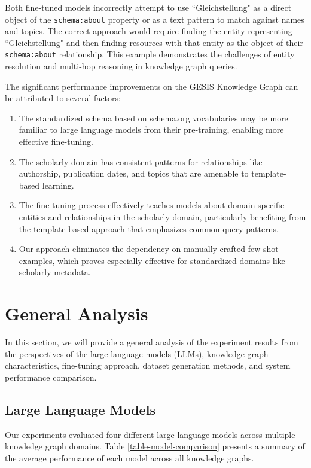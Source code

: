 Both fine-tuned models incorrectly attempt to use ``Gleichstellung" as a direct object of the \texttt{schema:about} property or as a text pattern to match against names and topics. The correct approach would require finding the entity representing ``Gleichstellung" and then finding resources with that entity as the object of their \texttt{schema:about} relationship. This example demonstrates the challenges of entity resolution and multi-hop reasoning in knowledge graph queries.

The significant performance improvements on the GESIS Knowledge Graph can be attributed to several factors:

\begin{enumerate}
    \item The standardized schema based on schema.org vocabularies may be more familiar to large language models from their pre-training, enabling more effective fine-tuning.
    \item The scholarly domain has consistent patterns for relationships like authorship, publication dates, and topics that are amenable to template-based learning.
    \item The fine-tuning process effectively teaches models about domain-specific entities and relationships in the scholarly domain, particularly benefiting from the template-based approach that emphasizes common query patterns.
    \item Our approach eliminates the dependency on manually crafted few-shot examples, which proves especially effective for standardized domains like scholarly metadata.
\end{enumerate}

\section{General Analysis}
In this section, we will provide a general analysis of the experiment results from the perspectives of the large language models (LLMs), knowledge graph characteristics, fine-tuning approach, dataset generation methods, and system performance comparison.

\subsection{Large Language Models}
\label{ga-llm}

Our experiments evaluated four different large language models across multiple knowledge graph domains. Table \ref{table-model-comparison} presents a summary of the average performance of each model across all knowledge graphs.

